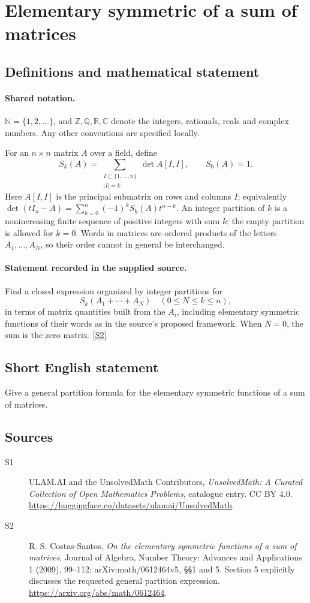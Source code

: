 \documentclass[11pt]{article}
\newcommand{\sref}[2]{\hyperlink{source:#1:#2}{[S#2]}}
\begin{document}
\section{Elementary symmetric of a sum of matrices}\label{statement}

\subsection{Definitions and mathematical statement}

\paragraph{Shared notation.}$\mathbb N=\{1,2,\ldots\}$, and $\mathbb Z,\mathbb Q,\mathbb R,\mathbb C$ denote the integers, rationals, reals and complex numbers. Any other conventions are specified locally.


For an $n\times n$ matrix $A$ over a field, define
\[
 S_k(A)=\sum_{\substack{I\subset\{1,\ldots,n\}\\|I|=k}}\det A[I,I],\qquad S_0(A)=1.
\]
Here $A[I,I]$ is the principal submatrix on rows and columns $I$; equivalently $\det(tI_n-A)=\sum_{k=0}^n(-1)^kS_k(A)t^{n-k}$. An integer partition of $k$ is a nonincreasing finite sequence of positive integers with sum $k$; the empty partition is allowed for $k=0$. Words in matrices are ordered products of the letters $A_1,\ldots,A_N$, so their order cannot in general be interchanged.
\paragraph{Statement recorded in the supplied source.}
Find a closed expression organized by integer partitions for
\[
 S_k(A_1+\cdots+A_N)
 \quad(0\leq N\leq k\leq n),
\]
in terms of matrix quantities built from the $A_i$, including elementary symmetric functions of their words as in the source's proposed framework. When $N=0$, the sum is the zero matrix. \sref{statement}{2}
\subsection{Short English statement}
Give a general partition formula for the elementary symmetric functions of a sum of matrices.
\subsection{Sources}
\begin{description}
\item[\hypertarget{source:statement:1}{S1}] ULAM.AI and the UnsolvedMath Contributors, \emph{UnsolvedMath: A Curated Collection of Open Mathematics Problems}, catalogue entry. CC BY 4.0. \url{https://huggingface.co/datasets/ulamai/UnsolvedMath}.
\item[\hypertarget{source:statement:2}{S2}] R. S. Costas-Santos, \emph{On the elementary symmetric functions of a sum of matrices}, Journal of Algebra, Number Theory: Advances and Applications 1 (2009), 99--112; arXiv:math/0612464v5, §§1 and 5. Section 5 explicitly discusses the requested general partition expression. \url{https://arxiv.org/abs/math/0612464}.
\end{description}
\label{end:statement}
\end{document}
